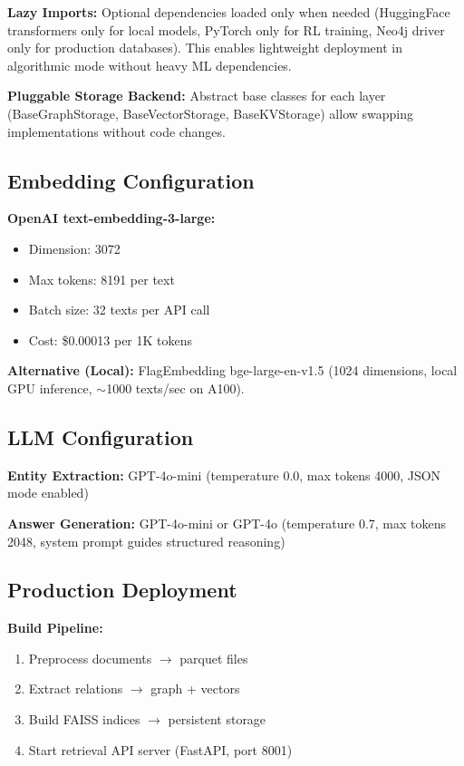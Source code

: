 \documentclass[11pt,a4paper]{article}
\begin{document}
\textbf{Lazy Imports:} Optional dependencies loaded only when needed (HuggingFace transformers only for local models, PyTorch only for RL training, Neo4j driver only for production databases). This enables lightweight deployment in algorithmic mode without heavy ML dependencies.

\textbf{Pluggable Storage Backend:} Abstract base classes for each layer (BaseGraphStorage, BaseVectorStorage, BaseKVStorage) allow swapping implementations without code changes.

\subsection{Embedding Configuration}

\textbf{OpenAI text-embedding-3-large:}
\begin{itemize}
    \item Dimension: 3072
    \item Max tokens: 8191 per text
    \item Batch size: 32 texts per API call
    \item Cost: \$0.00013 per 1K tokens
\end{itemize}

\textbf{Alternative (Local):} FlagEmbedding bge-large-en-v1.5 (1024 dimensions, local GPU inference, $\sim$1000 texts/sec on A100).

\subsection{LLM Configuration}

\textbf{Entity Extraction:} GPT-4o-mini (temperature 0.0, max tokens 4000, JSON mode enabled)

\textbf{Answer Generation:} GPT-4o-mini or GPT-4o (temperature 0.7, max tokens 2048, system prompt guides structured reasoning)

\subsection{Production Deployment}

\textbf{Build Pipeline:}
\begin{enumerate}
    \item Preprocess documents $\rightarrow$ parquet files
    \item Extract relations $\rightarrow$ graph + vectors
    \item Build FAISS indices $\rightarrow$ persistent storage
    \item Start retrieval API server (FastAPI, port 8001)
\end{enumerate}
\end{document}
